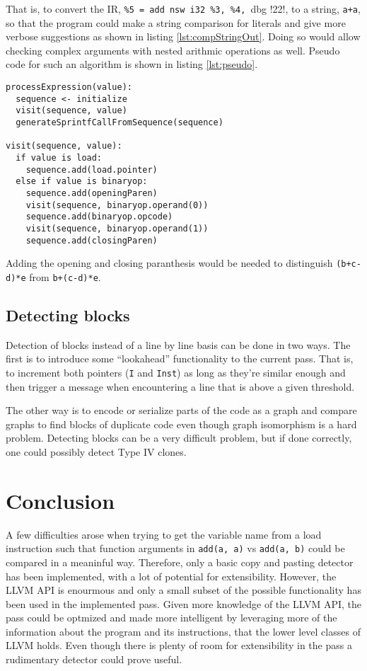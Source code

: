 \documentclass[a4paper,11pt]{article}
\theoremstyle{mytheor}
\begin{document}
That is, to convert the IR, \verb!%5 = add nsw i32 %3, %4, !dbg !22!, to a string, \verb!a+a!, so that the program could make a string comparison for literals and give more verbose suggestions as shown in listing \ref{lst:compStringOut}.
Doing so would allow checking complex arguments with nested arithmic operations as well. Pseudo code for such an  algorithm is shown in listing \ref{lst:pseudo}.

\begin{lstlisting}[caption=Pseudo code for improving comparison of method arguments, label={lst:pseudo}]
processExpression(value):
  sequence <- initialize
  visit(sequence, value)
  generateSprintfCallFromSequence(sequence)

visit(sequence, value):
  if value is load:
    sequence.add(load.pointer)
  else if value is binaryop:
    sequence.add(openingParen)
    visit(sequence, binaryop.operand(0))
    sequence.add(binaryop.opcode)
    visit(sequence, binaryop.operand(1))
    sequence.add(closingParen)
\end{lstlisting}
Adding the opening and closing paranthesis would be needed to distinguish \verb!(b+c-d)*e! from \verb!b+(c-d)*e!.

\subsection*{Detecting blocks}
Detection of blocks instead of a line by line basis can be done in two ways.
The first is to introduce some ``lookahead'' functionality to the current pass.
That is, to increment both pointers (\verb!I! and \verb!Inst!) as long as they're similar enough and then trigger a message when encountering a line that is above a given threshold.

The other way is to encode or serialize parts of the code as a graph and compare graphs to find blocks of duplicate code even though graph isomorphism is a hard problem.
Detecting blocks can be a very difficult problem, but if done correctly, one could possibly detect Type IV clones.


\section*{Conclusion}
A few difficulties arose when trying to get the variable name from a load instruction such that function arguments in \verb!add(a, a)! vs \verb!add(a, b)! could be compared in a meaninful way.
Therefore, only a basic copy and pasting detector has been implemented, with a lot of potential for extensibility.
However, the LLVM API is enourmous and only a small subset of the possible functionality has been used in the implemented pass.
Given more knowledge of the LLVM API, the pass could be optmized and made more intelligent by leveraging more of the information about the program and its instructions, that the lower level classes of LLVM holds.
Even though there is plenty of room for extensibility in the pass a rudimentary detector could prove useful.
\end{document}
